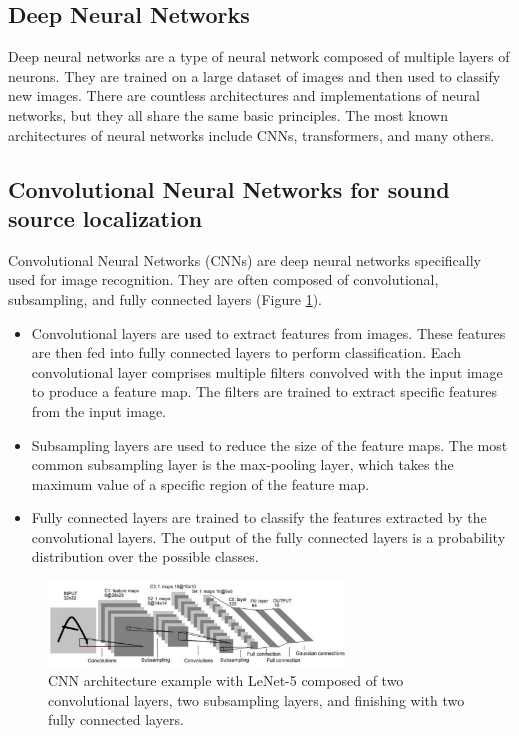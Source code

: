 \subsection{Deep Neural Networks}

Deep neural networks are a type of neural network composed of multiple layers of neurons\cite{Schmidhuber_2015}. They are trained on a large dataset of images and then used to classify new images. There are countless architectures \cite{LIU201711} and implementations of neural networks, but they all share the same basic principles. The most known architectures of neural networks include CNNs\cite{oshea2015introduction}, transformers\cite{vaswani2017attention}, and many others.

\subsection{Convolutional Neural Networks for sound source localization}
\label{sec:cnn_for_ssl}
Convolutional Neural Networks (CNNs)\cite{oshea2015introduction} are deep neural networks specifically used for image recognition. They are often composed of convolutional, subsampling, and fully connected layers (Figure \ref*{fig:cnn_example}).
\begin{itemize}
    \item{} Convolutional layers are used to extract features from images. These features are then fed into fully connected layers to perform classification. Each convolutional layer comprises multiple filters convolved with the input image to produce a feature map. The filters are trained to extract specific features from the input image.
    \item{} Subsampling layers are used to reduce the size of the feature maps. The most common subsampling layer is the max-pooling layer, which takes the maximum value of a specific region of the feature map.
    \item{} Fully connected layers are trained to classify the features extracted by the convolutional layers. The output of the fully connected layers is a probability distribution over the possible classes. 
\end{itemize}

\begin{figure}[H]
    \centering
    \includegraphics[width=0.7\textwidth]{../Images/cnn_example.png}
    \caption{CNN architecture example with LeNet-5 \protect\cite{726791} composed of two convolutional layers, two subsampling layers, and finishing with two fully connected layers.}
    \label{fig:cnn_example}
\end{figure}



